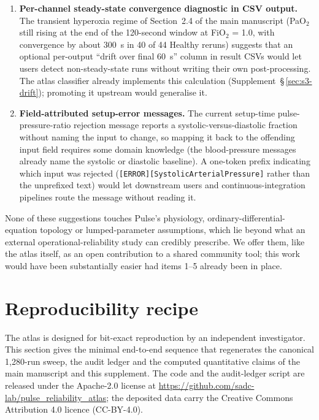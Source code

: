 \documentclass[pdflatex,sn-nature]{sn-jnl}%
\newcommand{\mainref}[2]{#2}
\begin{document}
\begin{enumerate}
\item \textbf{Per-channel steady-state convergence diagnostic in CSV output.} The transient hyperoxia regime of Section~\mainref{sec:results-hyperoxia}{2.4} of the main manuscript (PaO$_2$ still rising at the end of the 120-second window at FiO$_2$ = 1.0, with convergence by about 300~s in 40 of 44 Healthy reruns) suggests that an optional per-output ``drift over final 60~s'' column in result CSVs would let users detect non-steady-state runs without writing their own post-processing. The atlas classifier already implements this calculation (Supplement~\S\,\ref{sec:s3-drift}); promoting it upstream would generalise it.

\item \textbf{Field-attributed setup-error messages.} The current setup-time pulse-pressure-ratio rejection message reports a systolic-versus-diastolic fraction without naming the input to change, so mapping it back to the offending input field requires some domain knowledge (the blood-pressure messages already name the systolic or diastolic baseline). A one-token prefix indicating which input was rejected (\texttt{[ERROR][SystolicArterialPressure]} rather than the unprefixed text) would let downstream users and continuous-integration pipelines route the message without reading it.
\end{enumerate}

None of these suggestions touches Pulse's physiology, ordinary-differential-equation topology or lumped-parameter assumptions, which lie beyond what an external operational-reliability study can credibly prescribe. We offer them, like the atlas itself, as an open contribution to a shared community tool; this work would have been substantially easier had items 1--5 already been in place.


\section{Reproducibility recipe}\label{sec:s12}

The atlas is designed for bit-exact reproduction by an independent investigator. This section gives the minimal end-to-end sequence that regenerates the canonical 1{,}280-run sweep, the audit ledger and the computed quantitative claims of the main manuscript and this supplement. The code and the audit-ledger script are released under the Apache-2.0 license at \url{https://github.com/sadc-lab/pulse_reliability_atlas}; the deposited data carry the Creative Commons Attribution 4.0 licence (CC-BY-4.0).
\end{document}
